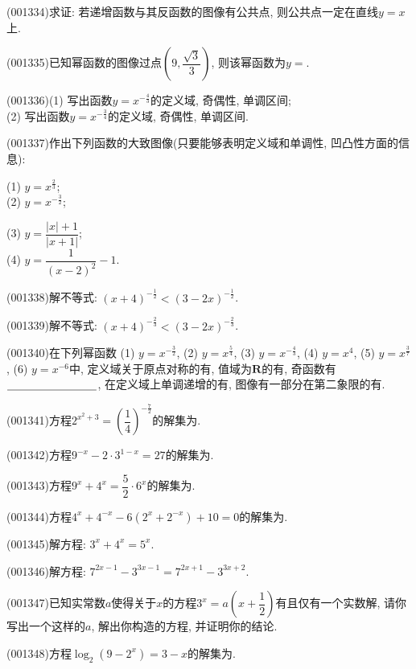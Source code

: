 \item (001334)求证: 若递增函数与其反函数的图像有公共点, 则公共点一定在直线$y=x$上.
\item (001335)已知幂函数的图像过点$(9,\dfrac{\sqrt{3}}{3})$, 则该幂函数为$y=$.
\item (001336)(1) 写出函数$y=x^{-\frac{4}{3}}$的定义域, 奇偶性, 单调区间;\\ 
(2) 写出函数$y=x^{-\frac{3}{4}}$的定义域, 奇偶性, 单调区间.
\item (001337)作出下列函数的大致图像(只要能够表明定义域和单调性, 凹凸性方面的信息):\\ 
\begin{multicols}{2}
(1) $y=x^{\frac{2}{3}}$; \\ 
(2) $y=x^{-\frac{3}{2}}$; \\ 
\end{multicols}
\begin{multicols}{2}
(3) $y=\dfrac{|x|+1}{|x+1|}$;  \\ 
(4) $y=\dfrac{1}{(x-2)^2}-1$.
\end{multicols}
\item (001338)解不等式: $(x+4)^{-\frac{1}{2}}<(3-2x)^{-\frac{1}{2}}$.
\item (001339)解不等式: $(x+4)^{-\frac{2}{3}}<(3-2x)^{-\frac{2}{3}}$.
\item (001340)在下列幂函数 (1) $y=x^{-\frac{3}{2}}$, (2) $y=x^{\frac{5}{4}}$, (3) $y=x^{-\frac{4}{3}}$, (4) $y=x^4$, (5) $y=x^{\frac{3}{7}}$, (6) $y=x^{-6}$中, 定义域关于原点对称的有, 值域为$\mathbf{R}$的有, 奇函数有$\blank{80}$, 在定义域上单调递增的有, 图像有一部分在第二象限的有.
\item (001341)方程$2^{x^2+3}=\left(\dfrac{1}{4}\right)^{-\frac{7}{2}}$的解集为.
\item (001342)方程$9^{-x}-2\cdot 3^{1-x}=27$的解集为.
\item (001343)方程$9^x+4^x=\dfrac{5}{2}\cdot 6^x$的解集为.
\item (001344)方程$4^x+4^{-x}-6(2^x+2^{-x})+10=0$的解集为.
\item (001345)解方程: $3^x+4^x=5^x$.
\item (001346)解方程: $7^{2x-1}-3^{3x-1}=7^{2x+1}-3^{3x+2}$.
\item (001347)已知实常数$a$使得关于$x$的方程$3^x=a\left(x+\dfrac{1}{2}\right)$有且仅有一个实数解, 请你写出一个这样的$a$, 解出你构造的方程, 并证明你的结论.
\item (001348)方程$\log_2(9-2^x)=3-x$的解集为.
